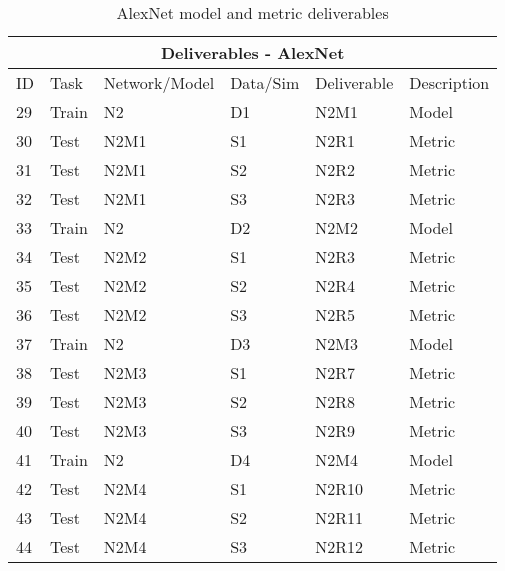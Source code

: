 \begin{table}[]
\begin{center}
\begin{tabular}{|l|l|l|l|l|l|}
\hline
\multicolumn{6}{|c|}{Deliverables - AlexNet} \\ \hline

ID & Task &  Network/Model & Data/Sim & Deliverable & Description \\ \hline\hline
29 & Train & N2 & D1 & N2M1 & Model \\ \hline
30 & Test & N2M1 & S1 & N2R1 & Metric \\ \hline
31 & Test & N2M1 & S2 & N2R2 & Metric \\ \hline
32 & Test & N2M1 & S3 & N2R3 & Metric \\ \hline\hline

33 & Train & N2 & D2 & N2M2 & Model \\ \hline
34 & Test & N2M2 & S1 & N2R3 & Metric \\ \hline
35 & Test & N2M2 & S2 & N2R4 & Metric \\ \hline
36 & Test & N2M2 & S3 & N2R5 & Metric \\ \hline\hline

37 & Train & N2 & D3 & N2M3 & Model \\ \hline
38 & Test & N2M3 & S1 & N2R7 & Metric \\ \hline
39 & Test & N2M3 & S2 & N2R8 & Metric \\ \hline
40 & Test & N2M3 & S3 & N2R9 & Metric \\ \hline\hline

41 & Train & N2 & D4 & N2M4 & Model \\ \hline
42 & Test & N2M4 & S1 & N2R10 & Metric \\ \hline
43 & Test & N2M4 & S2 & N2R11 & Metric \\ \hline
44 & Test & N2M4 & S3 & N2R12 & Metric \\ \hline 

\end{tabular}
\end{center}
\caption{AlexNet model and metric deliverables}
\label{Deliverables-AlexNet}
\end{table}



